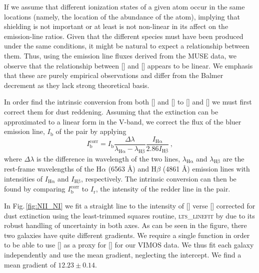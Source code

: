 		If we assume that different ionization states of a given atom occur in the same locations (namely, the location of the abundance of the atom), implying that shielding is not important or at least is not non-linear in its affect on the emission-line ratios. Given that the different species must have been produced under the same conditions, it might be natural to expect a relationship between them. Thus, using the emission line fluxes derived from the MUSE data, we observe that the relationship between [] and [] appears to be linear.%
		We emphasis that these are purely empirical observations and differ from the Balmer decrement as they lack strong theoretical basis. 

		In order find the intrinsic conversion from both [] and [] to [] and [] we must first correct them for dust reddening. Assuming that the extinction can be approximated to a linear form in the V-band, we correct the flux of the bluer emission line, $I_\mathrm{b}$ of the pair by applying
		\begin{equation}
			I^\mathrm{corr}_\mathrm{b} = I_\mathrm{b} \frac{\Delta\lambda}{\lambda_\mathrm{H\alpha} - \lambda_\mathrm{H\beta}} \frac{I_\mathrm{H\alpha}}{2.86 I_\mathrm{H\beta}} \, ,
		\end{equation}
		where $\Delta\lambda$ is the difference in wavelength of the two lines, $\lambda_\mathrm{H\alpha}$ and $\lambda_\mathrm{H\beta}$ are the rest-frame wavelengths of the H$\alpha$ (6563 \AA) and H$\beta$ (4861 \AA) emission lines with intensities of $I_\mathrm{H\alpha}$ and $I_\mathrm{H\beta}$, respectively. The intrinsic conversion can then be found by comparing $I^\mathrm{corr}_\mathrm{b}$ to $I_\mathrm{r}$, the intensity of the redder line in the pair. 

		In Fig.\,\ref{fig:NII_NI} we fit a straight line to the intensity of [] verse [] corrected for dust extinction using the least-trimmed squares routine, \textsc{lts\_linefit} by \citet{Cappellari2013} due to its robust handling of uncertainty in both axes. As can be seen in the figure, there two galaxies have quite different gradients. We require a single function in order to be able to use [] as a proxy for [] for our VIMOS data. We thus fit each galaxy independently and use the mean gradient, neglecting the intercept. We find a mean gradient of $12.23 \pm 0.14$.

